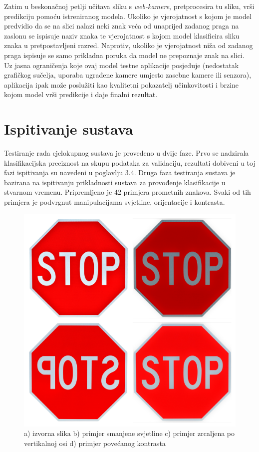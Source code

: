 \documentclass[times, utf8, zavrsni]{fer}
\begin{document}
Zatim u beskonačnoj petlji učitava sliku s \emph{web-kamere}, pretprocesira tu sliku, vrši predikciju pomoću istreniranog modela. Ukoliko je vjerojatnost s kojom je model predvidio da se na slici nalazi neki znak veća od unaprijed zadanog praga na zaslonu se ispisuje naziv
znaka te vjerojatnost s kojom model klasificira sliku znaka u pretpostavljeni razred. Naprotiv, ukoliko je vjerojatnost niža od zadanog praga ispisuje se samo prikladna poruka da model ne prepoznaje znak na slici.
\\Uz jasna ograničenja koje ovaj model testne aplikacije posjeduje (nedostatak grafičkog sučelja, uporaba ugrađene kamere umjesto zasebne kamere ili senzora), aplikacija ipak može poslužiti kao kvalitetni pokazatelj učinkovitosti i brzine kojom model vrši predikcije i daje finalni rezultat. 


\section{Ispitivanje sustava}
Testiranje rada cjelokupnog sustava je provedeno u dvije faze. Prvo se nadzirala klasifikacijska preciznost na skupu podataka za validaciju, rezultati dobiveni u toj fazi ispitivanja su navedeni u poglavlju 3.4. Druga faza testiranja sustava je bazirana na ispitivanju prikladnosti sustava za provođenje klasifikacije u stvarnom vremenu.
Pripremljeno je 42 primjera prometnih znakova. Svaki od tih primjera je podvrgnut manipulacijama svjetline, orijentacije i kontrasta. 
\begin{figure}[h!]
  \includegraphics[width=\linewidth,trim=4 4 4 4,clip]{images/stop_test.jpg}
  \caption{a) izvorna slika
b) primjer smanjene svjetline
c) primjer zrcaljena po vertikalnoj osi
d) primjer povećanog kontrasta
}
\end{figure} 
\end{document}

